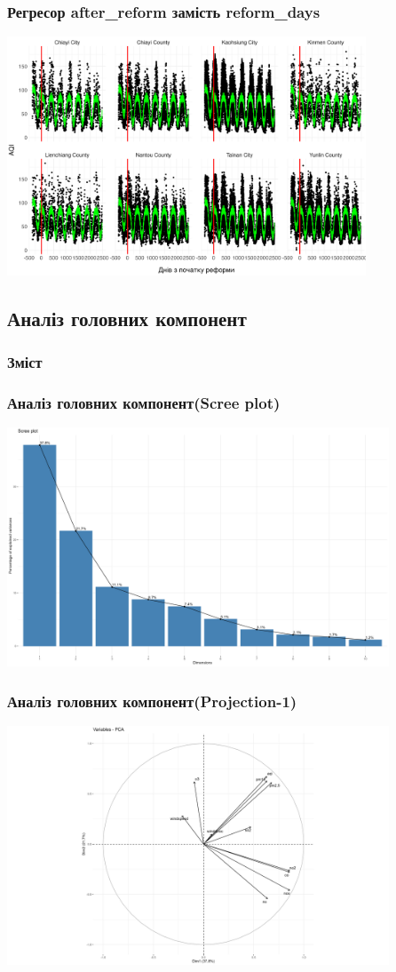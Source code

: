 ﻿\documentclass{beamer}
\begin{document}
\begin{frame}
\frametitle{Регресор after\_reform замість reform\_days}
  \includegraphics[height=2.8in]{plots/lab4/partial_linear/nppl_w_after_reform.png}
\end{frame}

\begin{frame}
  \section{Аналіз головних компонент}

  \frametitle{Зміст}
  \tableofcontents[currentsection]
\end{frame}

\begin{frame}
\frametitle{Аналіз головних компонент(Scree plot)}
  \includegraphics[height=2.8in]{plots/lab4/pca/scree.png}
\end{frame}

\begin{frame}
\frametitle{Аналіз головних компонент(Projection-1)}
  \includegraphics[height=2.8in]{plots/lab4/pca/projection-1-2.png}
\end{frame}
\end{document}
